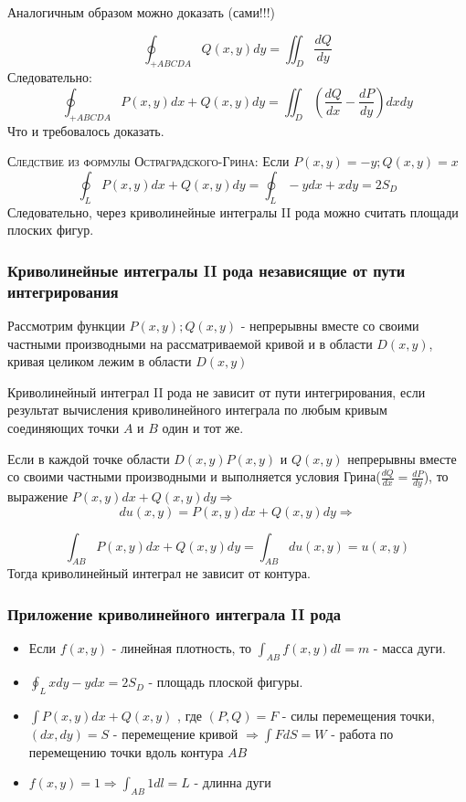 \begin{definition}
    Аналогичным образом можно доказать (сами!!!) 

    $$
        \oint_{+ABCDA} Q(x,y) dy = \iint_D \frac{dQ}{dy}
    $$
    Следовательно: 
    $$
    \oint_{+ABCDA} P(x,y)dx + Q(x,y) dy = \iint_D (\frac{dQ}{dx} - \frac{dP}{dy})dxdy
    $$
    Что и требовалось доказать. 

    \textsc{Следствие из формулы Остраградского-Грина:} Если $P(x,y) = - y; Q(x,y) = x$
    $$
        \oint_{L} P(x,y) dx + Q(x,y) dy = \oint_L - ydx + xdy = 2S_D
    $$ Следовательно, через криволинейные интегралы II рода можно считать площади плоских фигур.
\end{definition}

\subsubsection{Криволинейные интегралы II рода независящие от пути интегрирования}

Рассмотрим функции $P(x,y); Q(x,y)$ - непрерывны вместе со своими частными производными на рассматриваемой кривой и в области $D(x,y)$, кривая целиком лежим в области $D(x,y)$

Криволинейный интеграл II рода не зависит от пути интегрирования, если результат вычисления криволинейного интеграла по любым кривым соединяющих точки $A$ и $B$ один и тот же. 


\begin{theorem}
    Если в каждой точке области $D(x,y) P(x,y) $ и $Q(x,y)$ непрерывны вместе со своими частными производными и выполняется условия Грина($\frac{dQ}{dx} = \frac{dP}{dy}$), то выражение $P(x,y) dx + Q(x,y) dy \Rightarrow$ $$ du(x,y) = P(x,y) dx + Q(x,y) dy \Rightarrow $$ 

    $$
        \int_{AB} P(x,y) dx + Q(x,y) dy= \int_{AB} du(x,y) = u(x,y)
    $$ Тогда криволинейный интеграл не зависит от контура. 
\end{theorem}

\subsubsection{Приложение криволинейного интеграла II рода}
\begin{itemize}
    \item Если $f(x,y)$ - линейная плотность, то $\int_{AB} f(x,y) dl = m$ - масса дуги. 
    \item $\oint_L x dy - y dx = 2S_D$ - площадь плоской фигуры. 
    \item $\int P(x,y) dx + Q(x,y)$ , где $(P, Q) = F$ - силы перемещения точки, $(dx, dy) = S$ - перемещение кривой $\Rightarrow \int F dS = W$ - работа по перемещению точки вдоль контура $AB$ 
    \item $f(x,y) = 1 \Rightarrow \int_{AB} 1 dl = L $ - длинна дуги
\end{itemize}


